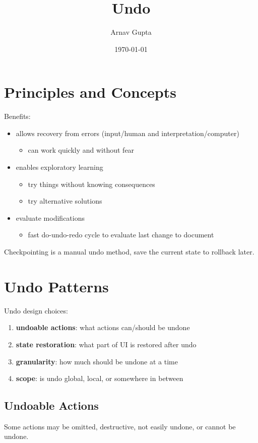\documentclass[11pt]{article}
\author{Arnav Gupta}
\date{\today}
\title{Undo}
\begin{document}
\maketitle
\tableofcontents

\section{Principles and Concepts}
\label{sec:org8c39932}
Benefits:
\begin{itemize}
\item allows recovery from errors (input/human and interpretation/computer)
\begin{itemize}
\item can work quickly and without fear
\end{itemize}
\item enables exploratory learning
\begin{itemize}
\item try things without knowing consequences
\item try alternative solutions
\end{itemize}
\item evaluate modifications
\begin{itemize}
\item fast do-undo-redo cycle to evaluate last change to document
\end{itemize}
\end{itemize}

Checkpointing is a manual undo method, save the current state to rollback later.
\section{Undo Patterns}
\label{sec:org271160b}
Undo design choices:
\begin{enumerate}
\item \textbf{undoable actions}: what actions can/should be undone
\item \textbf{state restoration}: what part of UI is restored after undo
\item \textbf{granularity}: how much should be undone at a time
\item \textbf{scope}: is undo global, local, or somewhere in between
\end{enumerate}
\subsection{Undoable Actions}
\label{sec:orgd30cd03}
Some actions may be omitted, destructive, not easily undone, or cannot be undone.
\end{document}
